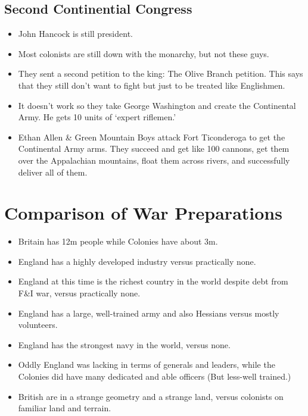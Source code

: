 \documentclass{article}
\begin{document}
      \subsection{Second Continential Congress}
        \begin{itemize}
          \item John Hancock is still president.
          \item Most colonists are still down with the monarchy, but not these guys.
          \item They sent a second petition to the king: The Olive Branch petition. This says that they still don't want to fight but just to be treated like Englishmen.
          \item It doesn't work so they take George Washington and create the Continental Army. He gets 10 units of `expert riflemen.'
          \item Ethan Allen \& Green Mountain Boys attack Fort Ticonderoga to get the Continental Army arms. They succeed and get like 100 cannons, get them over the Appalachian mountains, float them across rivers, and successfully deliver all of them.
        \end{itemize}

  \section{Comparison of War Preparations}
    \begin{itemize}
      \item Britain has 12m people while Colonies have about 3m.
      \item England has a highly developed industry versus practically none.
      \item England at this time is the richest country in the world despite debt from F\&I war, versus practically none.
      \item England has a large, well-trained army and also Hessians versus mostly volunteers.
      \item England has the strongest navy in the world, versus none. 
      \item Oddly England was lacking in terms of generals and leaders, while the Colonies did have many dedicated and able officers (But less-well trained.)
      \item British are in a strange geometry and a strange land, versus colonists on familiar land and terrain.
    \end{itemize}
\end{document}
